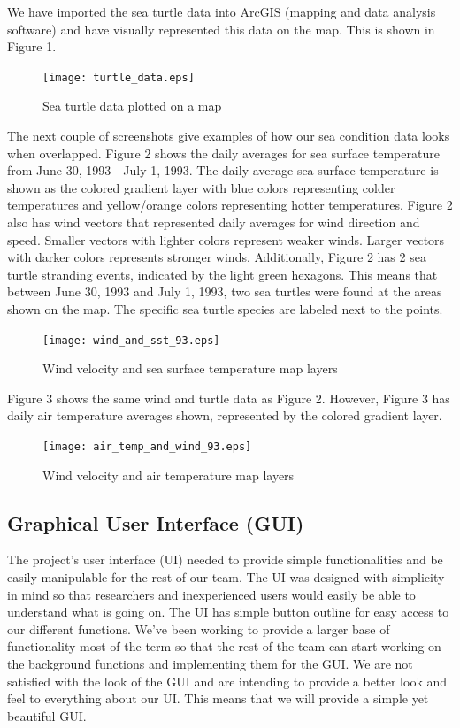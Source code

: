 \documentclass[onecolumn, draftclsnofoot,10pt, compsoc]{IEEEtran}
\begin{document}
We have imported the sea turtle data into ArcGIS (mapping and data analysis software) and have visually represented this data on the map. This is shown in Figure 1. \newline \newline

\begin{figure}[H]
  \texttt{[image: turtle\_data.eps]}
  \caption{Sea turtle data plotted on a map}
\end{figure}

The next couple of screenshots give examples of how our sea condition data looks when overlapped. Figure 2 shows the daily averages for sea surface temperature from June 30, 1993 - July 1, 1993. The daily average sea surface temperature is shown as the colored gradient layer with blue colors representing colder temperatures and yellow/orange colors representing hotter temperatures. Figure 2 also has wind vectors that represented daily averages for wind direction and speed. Smaller vectors with lighter colors represent weaker winds. Larger vectors with darker colors represents stronger winds. Additionally, Figure 2 has 2 sea turtle stranding events, indicated by the light green hexagons. This means that between June 30, 1993 and July 1, 1993, two sea turtles were found at the areas shown on the map. The specific sea turtle species are labeled next to the points. \newline

\begin{figure}[H]
  \texttt{[image: wind\_and\_sst\_93.eps]}
  \caption{Wind velocity and sea surface temperature map layers}
\end{figure}

Figure 3 shows the same wind and turtle data as Figure 2. However, Figure 3 has daily air temperature averages shown, represented by the colored gradient layer. 

\begin{figure}[H]
  \texttt{[image: air\_temp\_and\_wind\_93.eps]}
  \caption{Wind velocity and air temperature map layers}
\end{figure}



\subsection{Graphical User Interface (GUI)}
The project's user interface (UI) needed to provide simple functionalities and be easily manipulable for the rest of our team. The UI was designed with simplicity in mind so that researchers and inexperienced users would easily be able to understand what is going on. The UI has simple button outline for easy access to our different functions. We've been working to provide a larger base of functionality most of the term so that the rest of the team can start working on the background functions and implementing them for the GUI. We are not satisfied with the look of the GUI and are intending to provide a better look and feel to everything about our UI. This means that we will provide a simple yet beautiful GUI.
\end{document}
